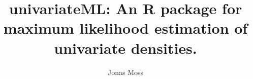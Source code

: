 \documentclass{standalone}
\begin{document}
\author
{
    Jonas Moss
}
\title{univariateML: An R package for maximum likelihood
estimation of univariate densities.}
\swmaketitle

\end{document}
